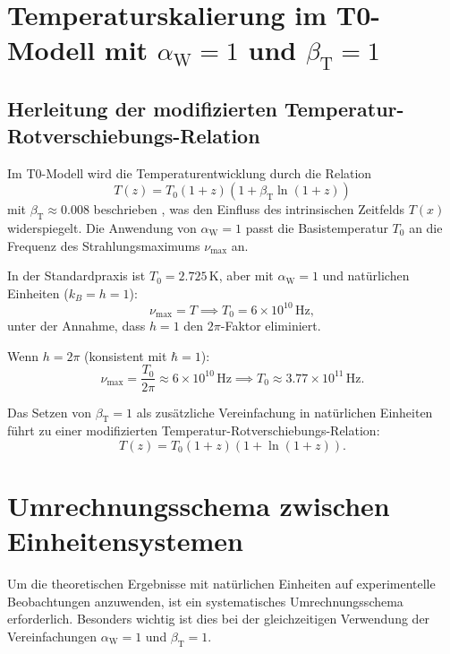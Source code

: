 \documentclass[12pt,a4paper]{article}
\newcommand{\Tfield}{T(x)}
\newcommand{\betaT}{\beta_{\text{T}}}
\newcommand{\alphaW}{\alpha_{\text{W}}}
\begin{document}
	\section{Temperaturskalierung im T0-Modell mit \(\alphaW = 1\) und \(\betaT = 1\)}
	
	\subsection{Herleitung der modifizierten Temperatur-Rotverschiebungs-Relation}
	
	Im T0-Modell wird die Temperaturentwicklung durch die Relation
	\begin{equation}
		T(z) = T_0 (1 + z) (1 + \betaT \ln(1 + z))
	\end{equation}
	mit \(\betaT \approx 0.008\) beschrieben \cite{pascher_messdifferenzen_2025}, was den Einfluss des intrinsischen Zeitfelds \(\Tfield\) widerspiegelt. Die Anwendung von \(\alphaW = 1\) passt die Basistemperatur \(T_0\) an die Frequenz des Strahlungsmaximums \(\nu_{\text{max}}\) an.
	
	In der Standardpraxis ist \(T_0 = 2.725 \, \text{K}\), aber mit \(\alphaW = 1\) und natürlichen Einheiten (\(k_B = h = 1\)):
	\[
	\nu_{\text{max}} = T \implies T_0 = 6 \times 10^{10} \, \text{Hz},
	\]
	unter der Annahme, dass \(h = 1\) den \(2\pi\)-Faktor eliminiert.
	
	Wenn \(h = 2\pi\) (konsistent mit \(\hbar = 1\)):
	\[
	\nu_{\text{max}} = \frac{T_0}{2\pi} \approx 6 \times 10^{10} \, \text{Hz} \implies T_0 \approx 3.77 \times 10^{11} \, \text{Hz}.
	\]
	
	Das Setzen von \(\betaT = 1\) als zusätzliche Vereinfachung in natürlichen Einheiten führt zu einer modifizierten Temperatur-Rotverschiebungs-Relation:
	\[
	T(z) = T_0 (1 + z) (1 + \ln(1 + z)).
	\]
	

	
\section{Umrechnungsschema zwischen Einheitensystemen}

Um die theoretischen Ergebnisse mit natürlichen Einheiten auf experimentelle Beobachtungen anzuwenden, ist ein systematisches Umrechnungsschema erforderlich. Besonders wichtig ist dies bei der gleichzeitigen Verwendung der Vereinfachungen \(\alphaW = 1\) und \(\betaT = 1\).
\end{document}
